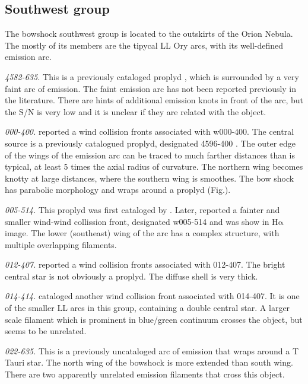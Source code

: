 \documentclass[iop, apj]{emulateapj}
\newcommand\ha{\ensuremath{\mathrm{H\alpha}}}
\begin{document}
\clearpage
\subsection{Southwest group}
\label{sec:sw-group}



The bowshock southwest group is located to the outskirts of the Orion Nebula. The mostly of its members are the tipycal LL Ory arcs, with its well-defined emission arc.  

\textit{4582-635.} This is a previously cataloged proplyd \citep{Ricci:2008a}, which is surrounded by a very faint arc of emission. The faint emission arc has not been reported previously in the literature. There are hints of additional emission knots in front of the arc, but the S/N is very low and it is unclear if  they are related with the object.

\textit{000-400.} \citet{Bally:2000a} reported a wind collision fronts associated with w000-400. The central source is a previously catalogued proplyd, designated 4596-400 \citep{Ricci:2008a}. The outer edge of the wings of the emission arc can be traced to much farther distances than is typical, at least 5 times the axial radius of curvature. The northern wing becomes knotty at large distances, where  the southern wing is smoothes. The bow shock has parabolic morphology and wraps around a proplyd (Fig.).   

\textit{005-514.} This proplyd was first cataloged by \citet{ODell:1996a}. Later, \citet{Bally:2000a} reported a fainter and smaller wind-wind collission front, designated w005-514 and was show in \ha{} image. The lower (southeast) wing of the arc has a complex structure, with multiple overlapping filaments.

\textit{012-407.} \citet{Bally:2000a} reported a wind collision fronts associated with 012-407. The bright central star is not obviously a proplyd. The diffuse shell is very thick.  

\textit{014-414.} \citet{Bally:2000a} cataloged another wind collision front associated with 014-407. It is one of the smaller LL arcs in this group, containing a double central star. A larger scale filament which is prominent in blue/green continuum crosses the object, but seems to be unrelated. 

\textit{022-635.} This is a previously uncataloged arc of emission that wraps around a T Tauri star. The north wing of the bowshock is more extended than south wing. There are two apparently unrelated emission filaments that cross this object. 
\end{document}
